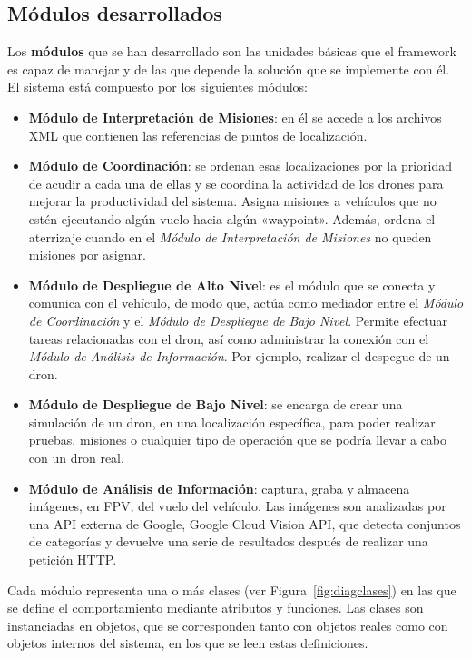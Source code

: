 \subsection{Módulos desarrollados}
\label{sec:modulos}

Los \textbf{módulos} que se han desarrollado son las unidades básicas que el framework es capaz de manejar y de las que depende la solución que se implemente con él. El sistema está compuesto por los siguientes módulos:

\begin{itemize}
\item \textbf{Módulo de Interpretación de Misiones}: en él se accede a los archivos XML que contienen las referencias de puntos de localización.
\item \textbf{Módulo de Coordinación}: se ordenan esas localizaciones por la prioridad de acudir a cada una de ellas y se coordina la actividad de los drones para mejorar la productividad del sistema. Asigna misiones a vehículos que no estén ejecutando algún vuelo hacia algún «waypoint». Además, ordena el aterrizaje cuando en el \textit{Módulo de Interpretación de Misiones} no queden misiones por asignar.
\item \textbf{Módulo de Despliegue de Alto Nivel}: es el módulo que se conecta y comunica con el vehículo, de modo que, actúa como mediador entre el \textit{Módulo de Coordinación} y el \textit{Módulo de Despliegue de Bajo Nivel}. Permite efectuar tareas relacionadas con el dron, así como administrar la conexión con el \textit{Módulo de Análisis de Información}. Por ejemplo, realizar el despegue de un dron.
\item \textbf{Módulo de Despliegue de Bajo Nivel}: se encarga de crear una simulación de un dron, en una localización específica, para poder realizar pruebas, misiones o cualquier tipo de operación que se podría llevar a cabo con un dron real.
\item \textbf{Módulo de Análisis de Información}: captura, graba y almacena imágenes, en \acs{FPV}, del vuelo del vehículo. Las imágenes son analizadas por una \acs{API} externa de Google, Google Cloud Vision \acs{API}, que detecta conjuntos de categorías y devuelve una serie de resultados después de realizar una petición \acs{HTTP}. 
\end{itemize} 

Cada módulo representa una o más clases (ver Figura~\ref{fig:diagclases}) en las que se define el comportamiento mediante atributos y funciones. Las clases son instanciadas en objetos, que se corresponden tanto con objetos reales como con objetos internos del sistema, en los que se leen estas definiciones.

